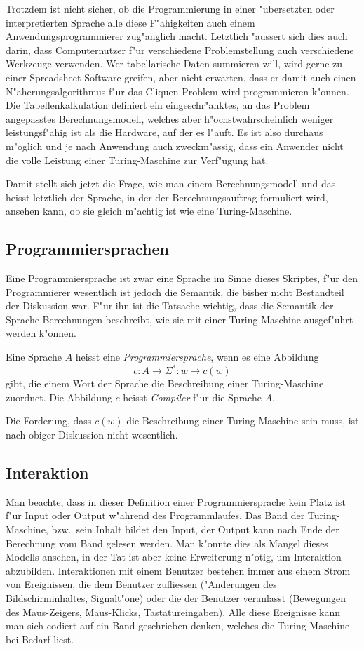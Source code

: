 Trotzdem ist nicht sicher, ob die Programmierung in einer "ubersetzten
oder interpretierten Sprache alle diese F"ahigkeiten auch einem
Anwendungsprogrammierer zug"anglich macht.
Letztlich "aussert sich dies auch darin, dass Computernutzer
f"ur verschiedene Problemstellung auch verschiedene Werkzeuge
verwenden. Wer tabellarische Daten summieren will, wird gerne
zu einer Spreadsheet-Software greifen, aber nicht erwarten, dass er
damit auch einen N"aherungsalgorithmus f"ur das Cliquen-Problem wird
programmieren k"onnen. Die Tabellenkalkulation definiert ein eingeschr"anktes,
an das Problem angepasstes Berechnungsmodell, welches aber
h"ochstwahrscheinlich weniger leistungsf"ahig ist als die Hardware, auf
der es l"auft. Es ist also durchaus m"oglich und je nach Anwendung auch
zweckm"assig, dass ein Anwender nicht die volle Leistung einer
Turing-Maschine zur Verf"ugung hat.

Damit stellt sich jetzt die Frage, wie man einem Berechnungsmodell und
das heisst letztlich der Sprache, in der der Berechnungsauftrag
formuliert wird, ansehen kann, ob sie gleich m"achtig ist wie eine
Turing-Maschine.

\subsection{Programmiersprachen}
Eine Programmiersprache ist zwar eine Sprache im Sinne dieses Skriptes,
f"ur den Programmierer wesentlich ist jedoch die Semantik, die bisher
nicht Bestandteil der Diskussion war. F"ur ihn ist die Tatsache wichtig,
dass die Semantik der Sprache Berechnungen beschreibt,
wie sie mit einer Turing-Maschine ausgef"uhrt werden k"onnen.

\begin{definition}
Eine Sprache $A$ heisst eine {\em Programmiersprache}, wenn es eine Abbildung
\[
c\colon A\to \Sigma^*\colon w\mapsto c(w)
\]
gibt, die einem Wort der Sprache die Beschreibung einer Turing-Maschine
zuordnet. Die Abbildung $c$ heisst {\em Compiler} f"ur die Sprache $A$.
\end{definition}
Die Forderung, dass $c(w)$ die Beschreibung einer Turing-Maschine
sein muss, ist nach obiger Diskussion nicht wesentlich.

\subsection{Interaktion}
Man beachte, dass in dieser Definition einer Programmiersprache kein Platz ist
f"ur Input oder Output w"ahrend des Programmlaufes.
Das Band der Turing-Maschine, bzw.~sein Inhalt bildet den Input, der Output
kann nach Ende der Berechnung vom Band gelesen werden.
Man k"onnte dies als Mangel dieses Modells ansehen, in der Tat ist aber
keine Erweiterung n"otig, um Interaktion abzubilden.
Interaktionen mit einem Benutzer bestehen immer aus einem Strom von
Ereignissen, die dem Benutzer zufliessen ("Anderungen des Bildschirminhaltes,
Signalt"one) oder die der Benutzer veranlasst (Bewegungen des Maus-Zeigers,
Maus-Klicks, Tastatureingaben). Alle diese Ereignisse kann man sich codiert
auf ein Band geschrieben denken, welches die Turing-Maschine bei Bedarf
liest.

